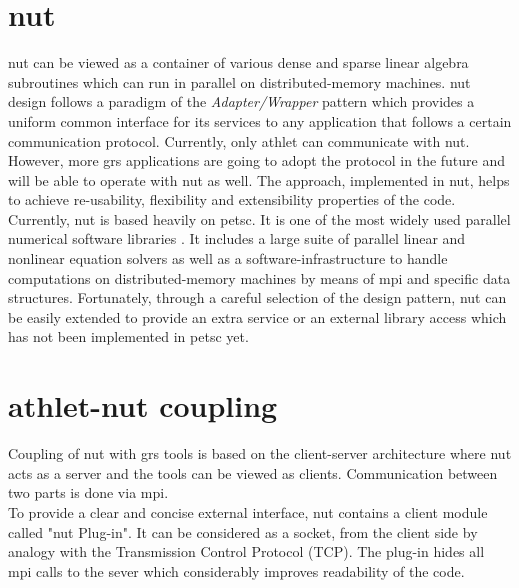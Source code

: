 \section{\acrshort{nut}}

\acrfull{nut} can be viewed as a container of various dense and sparse linear algebra subroutines which can run in parallel on distributed-memory machines. \acrshort{nut} design follows a paradigm of the \textit{Adapter/Wrapper} pattern which provides a uniform common interface for its services to any application that follows a certain communication protocol. Currently, only \acrshort{athlet} can communicate with \acrshort{nut}. However, more \acrshort{grs} applications are going to adopt the protocol in the future and will be able to operate with \acrshort{nut} as well. The approach, implemented in \acrshort{nut}, helps to achieve re-usability, flexibility and extensibility properties of the code.\\


Currently, \acrshort{nut} is based heavily on \acrfull{petsc}. It is one of the most widely used parallel numerical software  libraries \cite{wiki:petsc-general-info}. It includes a large suite of parallel linear and nonlinear equation solvers as well as a software-infrastructure to handle computations on distributed-memory machines by means of  \acrfull{mpi} and specific data structures. Fortunately, through a careful selection of the design pattern, \acrshort{nut} can be easily extended to provide an extra service or an external library access which has not been implemented in \acrshort{petsc} yet.\\ 


\section{\acrshort{athlet}-\acrshort{nut} coupling}
\label{sec:athlet-nut-coupling}


Coupling of \acrshort{nut} with \acrshort{grs} tools is based on the client-server architecture where \acrshort{nut} acts as a server and the tools can be viewed as clients. Communication between two parts is done via \acrshort{mpi}.\\


To provide a clear and concise external interface, \acrshort{nut} contains a client module called "\acrshort{nut} Plug-in". It can be  considered as a socket, from the client side by analogy with the Transmission Control Protocol (TCP). The plug-in hides all \acrshort{mpi} calls to the sever which considerably improves readability of the code.\\


